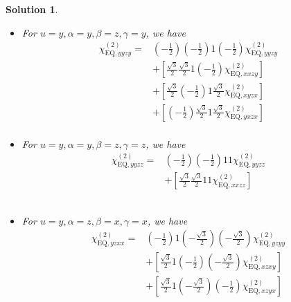 \documentclass[UTF8,10pt,a4paper]{article}
\theoremstyle{Problem}
\theoremstyle{Solution}
\newtheorem*{sol}{Solution}
\begin{document}
\begin{sol}
\begin{itemize}
\begin{align}
\nonumber&+\left[\frac{\sqrt{3}}{2}\frac{\sqrt{3}}{2}1\left(-\frac{\sqrt{3}}{2}\right)\chi_{\text{EQ},xxzy}^{(2)}\right]\\
\nonumber&+\left[\frac{\sqrt{3}}{2}\left(-\frac{1}{2}\right)1\left(-\frac{1}{2}\right)\chi_{\text{EQ},xyzx}^{(2)}\right]\\
\nonumber&+\left[\left(-\frac{1}{2}\right)\frac{\sqrt{3}}{2}1\left(-\frac{1}{2}\right)\chi_{\text{EQ},yxzx}^{(2)}\right]\\
&
\end{align}\normalsize
\item For $u=y,\alpha=y,\beta=z,\gamma=y$, we have
\footnotesize\begin{align}
\nonumber\chi_{\text{EQ},yyzy}^{(2)}=&\left(-\frac{1}{2}\right)\left(-\frac{1}{2}\right)1\left(-\frac{1}{2}\right)\chi_{\text{EQ},yyzy}^{(2)}\\
\nonumber&+\left[\frac{\sqrt{3}}{2}\frac{\sqrt{3}}{2}1\left(-\frac{1}{2}\right)\chi_{\text{EQ},xxzy}^{(2)}\right]\\
\nonumber&+\left[\frac{\sqrt{3}}{2}\left(-\frac{1}{2}\right)1\frac{\sqrt{3}}{2}\chi_{\text{EQ},xyzx}^{(2)}\right]\\
\nonumber&+\left[\left(-\frac{1}{2}\right)\frac{\sqrt{3}}{2}1\frac{\sqrt{3}}{2}\chi_{\text{EQ},yxzx}^{(2)}\right]\\
&
\end{align}\normalsize
\item For $u=y,\alpha=y,\beta=z,\gamma=z$, we have
\footnotesize\begin{align}
\nonumber\chi_{\text{EQ},yyzz}^{(2)}=&\left(-\frac{1}{2}\right)\left(-\frac{1}{2}\right)11\chi_{\text{EQ},yyzz}^{(2)}\\
\nonumber&+\left[\frac{\sqrt{3}}{2}\frac{\sqrt{3}}{2}11\chi_{\text{EQ},xxzz}^{(2)}\right]\\
\nonumber&\\
\nonumber&\\
&
\end{align}\normalsize
\item For $u=y,\alpha=z,\beta=x,\gamma=x$, we have
\footnotesize\begin{align}
\nonumber\chi_{\text{EQ},yzxx}^{(2)}=&\left(-\frac{1}{2}\right)1\left(-\frac{\sqrt{3}}{2}\right)\left(-\frac{\sqrt{3}}{2}\right)\chi_{\text{EQ},yzyy}^{(2)}\\
\nonumber&+\left[\frac{\sqrt{3}}{2}1\left(-\frac{1}{2}\right)\left(-\frac{\sqrt{3}}{2}\right)\chi_{\text{EQ},xzxy}^{(2)}\right]\\
\nonumber&+\left[\frac{\sqrt{3}}{2}1\left(-\frac{\sqrt{3}}{2}\right)\left(-\frac{1}{2}\right)\chi_{\text{EQ},xzyx}^{(2)}\right]\\

\end{align}
\end{itemize}
\end{sol}
\end{document}
